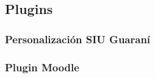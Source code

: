 \subsection{Plugins}
\label{desarrollo_plugins}

\subsubsection{Personalización SIU Guaraní}
\label{desarrollo_plugins_guarani}

\subsubsection{Plugin Moodle}
\label{desarrollo_plugins_moodle}